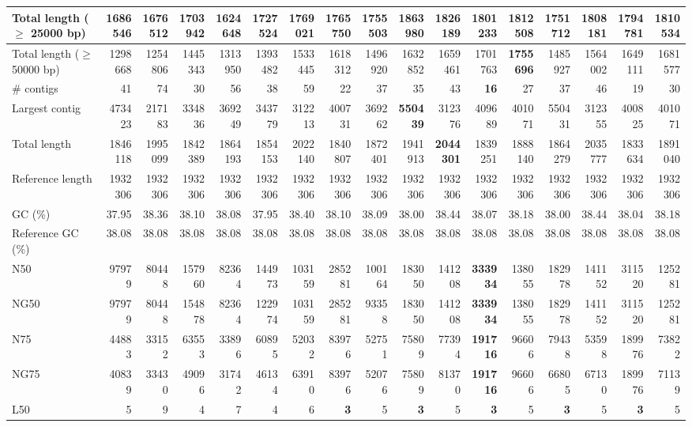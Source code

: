 \documentclass[12pt,a4paper]{article}
\begin{document}
\begin{table}[ht]
\begin{center}
\begin{tabular}{|l*{16}{|r}|}
Total length ($\geq$ 25000 bp) & 1686546 & 1676512 & 1703942 & 1624648 & 1727524 & 1769021 & 1765750 & 1755503 & {\bf 1863980} & 1826189 & 1801233 & 1812508 & 1751712 & 1808181 & 1794781 & 1810534 \\ \hline
Total length ($\geq$ 50000 bp) & 1298668 & 1254806 & 1445343 & 1313950 & 1393482 & 1533445 & 1618312 & 1496920 & 1632852 & 1659461 & 1701763 & {\bf 1755696} & 1485927 & 1564002 & 1649111 & 1681577 \\ \hline
\# contigs & 41 & 74 & 30 & 56 & 38 & 59 & 22 & 37 & 35 & 43 & {\bf 16} & 27 & 37 & 46 & 19 & 30 \\ \hline
Largest contig & 473423 & 217183 & 334836 & 369249 & 343779 & 312213 & 400731 & 369262 & {\bf 550439} & 312376 & 409689 & 401071 & 550431 & 312355 & 400825 & 401071 \\ \hline
Total length & 1846118 & 1995099 & 1842389 & 1864193 & 1854153 & 2022140 & 1840807 & 1872401 & 1941913 & {\bf 2044301} & 1839251 & 1888140 & 1864279 & 2035777 & 1833634 & 1891040 \\ \hline
Reference length & 1932306 & 1932306 & 1932306 & 1932306 & 1932306 & 1932306 & 1932306 & 1932306 & 1932306 & 1932306 & 1932306 & 1932306 & 1932306 & 1932306 & 1932306 & 1932306 \\ \hline
GC (\%) & 37.95 & 38.36 & 38.10 & 38.08 & 37.95 & 38.40 & 38.10 & 38.09 & 38.00 & 38.44 & 38.07 & 38.18 & 38.00 & 38.44 & 38.04 & 38.18 \\ \hline
Reference GC (\%) & 38.08 & 38.08 & 38.08 & 38.08 & 38.08 & 38.08 & 38.08 & 38.08 & 38.08 & 38.08 & 38.08 & 38.08 & 38.08 & 38.08 & 38.08 & 38.08 \\ \hline
N50 & 97979 & 80448 & 157960 & 82364 & 144973 & 103159 & 285281 & 100164 & 183050 & 141208 & {\bf 333934} & 138055 & 182978 & 141152 & 311520 & 125281 \\ \hline
NG50 & 97979 & 80448 & 154878 & 82364 & 122974 & 103159 & 285281 & 93358 & 183050 & 141208 & {\bf 333934} & 138055 & 182978 & 141152 & 311520 & 125281 \\ \hline
N75 & 44883 & 33152 & 63553 & 33896 & 60895 & 52032 & 83976 & 52751 & 75809 & 77394 & {\bf 191716} & 96606 & 79438 & 53598 & 189976 & 73822 \\ \hline
NG75 & 40839 & 33430 & 49096 & 31742 & 46134 & 63910 & 83976 & 52076 & 75809 & 81370 & {\bf 191716} & 96606 & 66805 & 67130 & 189976 & 71139 \\ \hline
L50 & 5 & 9 & 4 & 7 & 4 & 6 & {\bf 3} & 5 & {\bf 3} & 5 & {\bf 3} & 5 & {\bf 3} & 5 & {\bf 3} & 5 \\ \hline

\end{tabular}
\end{center}
\end{table}
\end{document}
